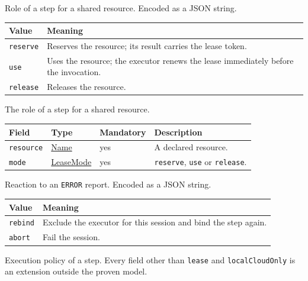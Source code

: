 \documentclass[a4paper]{arrowhead}
\newcommand{\mref}[1]{{\textcolor{ArrowheadPurple}{\hyperref[sec:model:#1]{#1}}}}
\newcommand{\pref}[1]{{\textcolor{ArrowheadGrey}{\hyperref[sec:model:primitives:#1]{#1}}}}
\begin{document}
Role of a step for a shared resource.
 Encoded as a JSON string.
{\small
\begin{longtable}{|p{3.9cm}|p{11.9cm}|}

\hline
\rowcolor{gray!33} Value & Meaning \\ \hline
\endhead
\texttt{reserve} & Reserves the resource; its result carries the lease token. \\ \hline
\texttt{use} & Uses the resource; the executor renews the lease immediately before the invocation. \\ \hline
\texttt{release} & Releases the resource. \\ \hline
\end{longtable}
}

The role of a step for a shared resource.

{\small
\begin{longtable}{|p{3.7cm}|p{4.2cm}|p{1.6cm}|p{6.3cm}|}

\hline
\rowcolor{gray!33} Field & Type & Mandatory & Description \\ \hline
\endhead
\texttt{resource} & \pref{Name} & yes & A declared resource. \\ \hline
\texttt{mode} & \mref{LeaseMode} & yes & \texttt{reserve}, \texttt{use} or \texttt{release}. \\ \hline
\end{longtable}
}

Reaction to an \texttt{ERROR} report.
 Encoded as a JSON string.
{\small
\begin{longtable}{|p{3.9cm}|p{11.9cm}|}

\hline
\rowcolor{gray!33} Value & Meaning \\ \hline
\endhead
\texttt{rebind} & Exclude the executor for this session and bind the step again. \\ \hline
\texttt{abort} & Fail the session. \\ \hline
\end{longtable}
}

Execution policy of a step. Every field other than \texttt{lease} and \texttt{localCloudOnly} is an extension outside the proven model.
\end{document}
